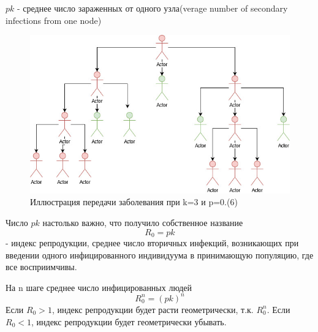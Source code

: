 $pk$ - среднее число зараженных от одного узла(verage number of secondary infections from one node)
\begin{figure}[h]

\centering

\includegraphics[width=0.8\linewidth]{transmission_schem.jpg}

\caption{Иллюстрация передачи заболевания при k=3 и p=0.(6)}

\label{fig:mpr}

\end{figure}
Число $pk$ настолько важно, что получило собственное название
\begin{equation}
R_0=pk\end{equation}
- индекс репродукции, среднее число вторичных инфекций, возникающих при введении одного инфицированного индивидуума в принимающую популяцию, где все восприимчивы.

На n шаге среднее число инфицированных людей
\begin{equation}
R_0^n= (pk)^n
\end{equation}
Если $R_0 > 1$, индекс репродукции будет расти геометрически, т.к. $R_0^n$.\skip
Если $R_0 < 1$, индекс репродукции будет геометрически убывать.


